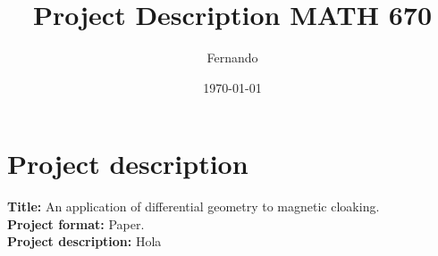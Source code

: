 \documentclass{article}
\begin{document}
\newcommand{\R}{\mathbb{R}}

\title{Project Description MATH 670}
\author{Fernando}
\date{\today}
\maketitle

\section*{Project description}

\textbf{Title:} An application of differential geometry to magnetic cloaking.\\
\textbf{Project format:} Paper.\\
\textbf{Project description:} Hola
\end{document}
